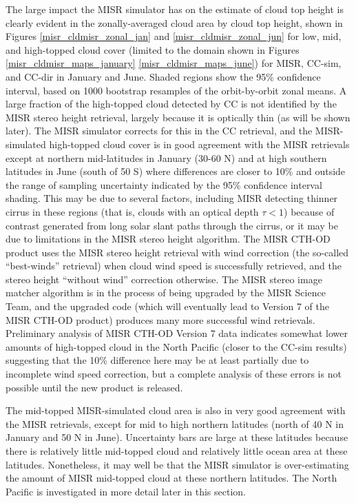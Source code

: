 The large impact the MISR simulator has on the estimate of cloud top height is clearly evident in the zonally-averaged cloud area by cloud top height, shown in Figures \ref{misr_cldmisr_zonal_jan} and \ref{misr_cldmisr_zonal_jun} for low, mid, and high-topped cloud cover (limited to the domain shown in Figures \ref{misr_cldmisr_maps_january} \ref{misr_cldmisr_maps_june}) for MISR, CC-sim, and CC-dir in January and June. Shaded regions show the 95\% confidence interval, based on 1000 bootstrap resamples of the orbit-by-orbit zonal means. A large fraction of the high-topped cloud detected by CC is not identified by the MISR stereo height retrieval, largely because it is optically thin (as will be shown later). The MISR simulator corrects for this in the CC retrieval, and the MISR-simulated high-topped cloud cover is in good agreement with the MISR retrievals except at northern mid-latitudes in January (30-60 N) and at high southern latitudes in June (south of 50 S) where differences are closer to 10\% and outside the range of sampling uncertainty indicated by the 95\% confidence interval shading. This may be due to several factors, including MISR detecting thinner cirrus in these regions (that is, clouds with an optical depth $\tau < 1$) because of contrast generated from long solar slant paths through the cirrus, or it may be due to limitations in the MISR stereo height algorithm. The MISR CTH-OD product uses the MISR stereo height retrieval with wind correction (the so-called ``best-winds'' retrieval) when cloud wind speed is successfully retrieved, and the stereo height ``without wind'' correction otherwise. The MISR stereo image matcher algorithm is in the process of being upgraded by the MISR Science Team, and the upgraded code (which will eventually lead to Version 7 of the MISR CTH-OD product) produces many more successful wind retrievals. Preliminary analysis of MISR CTH-OD Version 7 data indicates somewhat lower amounts of high-topped cloud in the North Pacific (closer to the CC-sim results) suggesting that the 10\% difference here may be at least partially due to incomplete wind speed correction, but a complete analysis of these errors is not possible until the new product is released.

The mid-topped MISR-simulated cloud area is also in very good agreement with the MISR retrievals, except for mid to high northern latitudes (north of 40 N in January and 50 N in June). Uncertainty bars are large at these latitudes because there is relatively little mid-topped cloud and relatively little ocean area at these latitudes. Nonetheless, it may well be that the MISR simulator is over-estimating the amount of MISR mid-topped cloud at these northern latitudes. The North Pacific is investigated in more detail later in this section.


